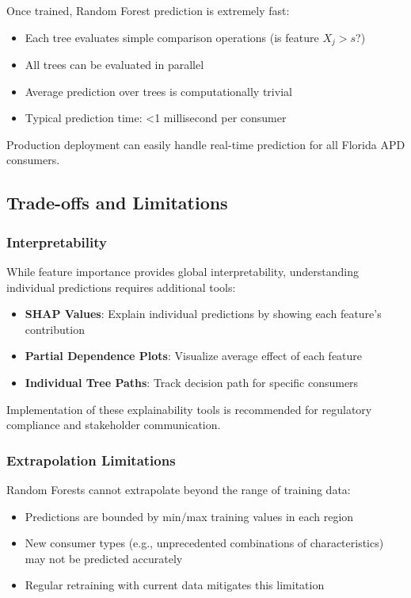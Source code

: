Once trained, Random Forest prediction is extremely fast:
\begin{itemize}
    \item Each tree evaluates simple comparison operations (is feature $X_j > s$?)
    \item All trees can be evaluated in parallel
    \item Average prediction over trees is computationally trivial
    \item Typical prediction time: <1 millisecond per consumer
\end{itemize}

Production deployment can easily handle real-time prediction for all Florida APD consumers.

\subsection{Trade-offs and Limitations}

\subsubsection{Interpretability}

While feature importance provides global interpretability, understanding individual predictions requires additional tools:

\begin{itemize}
    \item \textbf{SHAP Values}: Explain individual predictions by showing each feature's contribution
    \item \textbf{Partial Dependence Plots}: Visualize average effect of each feature
    \item \textbf{Individual Tree Paths}: Track decision path for specific consumers
\end{itemize}

Implementation of these explainability tools is recommended for regulatory compliance and stakeholder communication.

\subsubsection{Extrapolation Limitations}

Random Forests cannot extrapolate beyond the range of training data:

\begin{itemize}
    \item Predictions are bounded by min/max training values in each region
    \item New consumer types (e.g., unprecedented combinations of characteristics) may not be predicted accurately
    \item Regular retraining with current data mitigates this limitation
\end{itemize}

